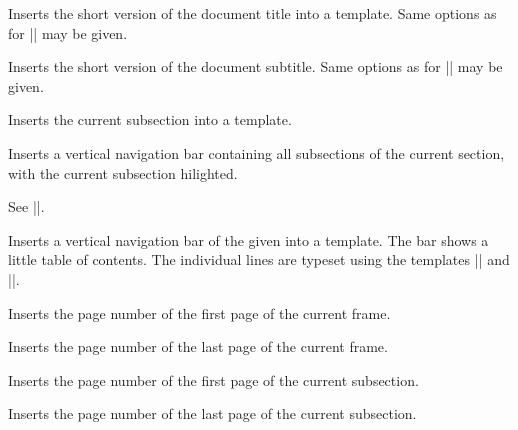 \begin{command}{\insertshorttitle{}}
  Inserts the short version of the document title into a template. Same
  options as for |\insertshortauthor| may be given. 
\end{command}

\begin{command}{\insertshortsubtitle{}}
  Inserts the short version of the document subtitle. Same
  options as for |\insertshortauthor| may be given. 
\end{command}

\begin{command}{\insertsubsection}
  Inserts the current subsection into a template.
\end{command}

\begin{command}{\insertsubsectionnavigation{}}
  Inserts a vertical navigation bar containing all subsections of the
  current section, with the current subsection hilighted.
\end{command}

\begin{command}{\insertsubsectionnavigationhorizontal{}%
    }
  See |\insertsectionnavigationhorizontal|.
\end{command}


\begin{command}{\insertverticalnavigation{}}
  Inserts a vertical navigation bar of the given  into a
  template. The bar shows a little table of contents. The individual
  lines are typeset using the templates
  |\usesectionsidetemplate| and |\usesubsectionsidetemplate|.
\end{command}

\begin{command}{\insertframestartpage}
  Inserts the page number of the first page of the current frame.
\end{command}

\begin{command}{\insertframeendpage}
  Inserts the page number of the last page of the current frame.
\end{command}

\begin{command}{\insertsubsectionstartpage}
  Inserts the page number of the first page of the current subsection.
\end{command}

\begin{command}{\insertsubsectionendpage}
  Inserts the page number of the last page of the current subsection.
\end{command}


